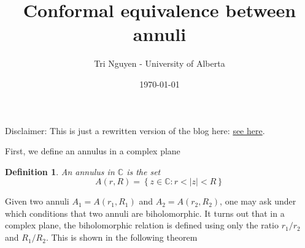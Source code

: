 \documentclass[12pt]{article} %
\title{Conformal equivalence between annuli} %
\author{Tri Nguyen - University of Alberta} %
\date{\today} %
\newtheorem{definition}{Definition}
\begin{document}
\maketitle %
Disclaimer: This is just a rewritten version of the blog here:
\href{http://cykenleung.blogspot.com/2012/04/conformal-equivalence-of-annuli.html}{see here}.

First, we define an annulus in a complex plane
\begin{definition}
  An annulus in $\mathbb{C}$ is the set
  \[A(r,R) = \left\lbrace z \in \mathbb{C}: r < |z| <R \right\rbrace\]
\end{definition}
Given two annuli $A_1 = A(r_1, R_1)$ and $A_2 = A(r_2, R_2)$, one may ask under which conditions
that two annuli are biholomorphic. It turns out that in a complex plane, the biholomorphic relation is defined using only
the ratio $r_1/r_2$ and $R_1/R_2$. This is shown in the following theorem
\end{document}
